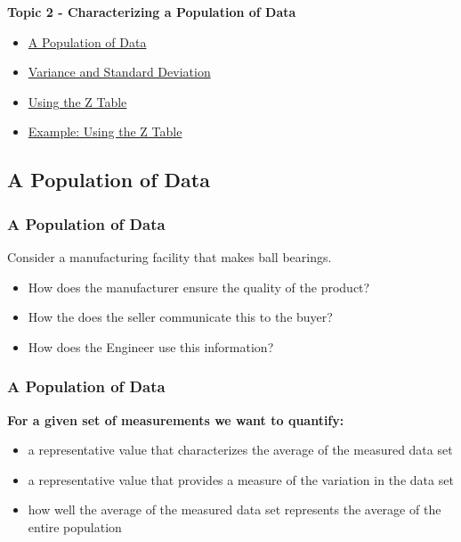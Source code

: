 \documentclass[fleqn]{beamer} %
\newcommand{\sectionIItitle}{Characterizing a Population of Data}
\newcommand{\sectionIIsubsectionItitle}{A Population of Data}
\newcommand{\sectionIIsubsectionIItitle}{Variance and Standard Deviation}
\newcommand{\sectionIIsubsectionIIItitle}{Using the Z Table}
\newcommand{\sectionIIsubsectionIVtitle}{Example: Using the Z Table}
\begin{document}
		\begin{frame}
			\large \textbf{Topic 2 - \sectionIItitle} \vspace{3mm}\\

			\begin{itemize}
				\item \hyperlink{sectionIIsubsectionI}{\sectionIIsubsectionItitle} \vspc %
				\item \hyperlink{sectionIIsubsectionII}{\sectionIIsubsectionIItitle} \vspc %
				\item \hyperlink{sectionIIsubsectionIII}{\sectionIIsubsectionIIItitle} \vspc %
				\item \hyperlink{sectionIIsubsectionIV}{\sectionIIsubsectionIVtitle} \vspc %
			\end{itemize}

		\end{frame}

		\subsection{\sectionIIsubsectionItitle}\label{sectionIIsubsectionI}

			\begin{frame}[label=sectionIIsubsectionI]
				\frametitle{\sectionIIsubsectionItitle}

				Consider a manufacturing facility that makes ball bearings. 
				\begin{itemize}		
					\item How does the manufacturer ensure the quality of the product?
					\item How the does the seller communicate this to the buyer?
					\item How does the Engineer use this information? 
				\end{itemize}

			\end{frame}

		    \begin{frame}[label=sectionIIsubsectionI]
				\frametitle{\sectionIIsubsectionItitle}

				\textbf{For a given set of measurements we want to quantify:}
				\begin{itemize}
					\item a representative value that characterizes the average of the measured data set
					\item a representative value that provides a measure of the variation in the data set
					\item how well the average of the measured data set represents the average of the entire population
				\end{itemize}

			\end{frame}	
\end{document}
